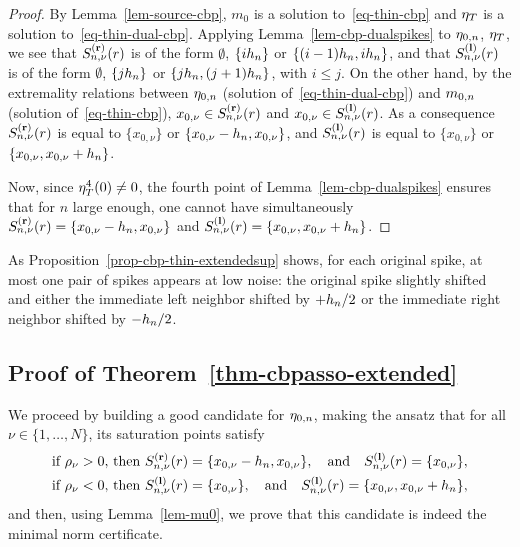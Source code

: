 \begin{proof}
By Lemma~\ref{lem-source-cbp}, $m_0$ is a solution to~\eqref{eq-thin-cbp} and $\eta_T$ is a solution to~\eqref{eq-thin-dual-cbp}. 
Applying Lemma~\ref{lem-cbp-dualspikes} to $\eta_{0,n}$, $\eta_T$, we see that $S_{n,\nu}^{\mathbf{(r)}}(r)$ is of the form $\emptyset$, $\{i{h_n}\}$ or $\{(i-1){h_n},i{h_n}\}$, and that $S_{n,\nu}^{\mathbf{(l)}}(r)$ is of the form $\emptyset$, $\{j{h_n}\}$ or $\{j{h_n},(j+1){h_n}\}$, with $i\leq j$.
On the other hand, by the extremality relations between $\eta_{0,n}$ (solution of~\eqref{eq-thin-dual-cbp}) and $m_{0,n}$ (solution of~\eqref{eq-thin-cbp}), $x_{0,\nu}\in S_{n,\nu}^{\mathbf{(r)}}(r)$ and $x_{0,\nu}\in S_{n,\nu}^{\mathbf{(l)}}(r)$. As a consequence $S_{n,\nu}^{\mathbf{(r)}}(r)$ is equal to $\{x_{0,\nu}\}$ or $\{x_{0,\nu}-{h_n},x_{0,\nu}\}$, and $S_{n,\nu}^{\mathbf{(l)}}(r)$ is  equal to $\{x_{0,\nu}\}$ or $\{x_{0,\nu},x_{0,\nu}+{h_n}\}$.

Now, since $\eta_T^{4}(0)\neq 0$, the fourth point of Lemma~\ref{lem-cbp-dualspikes} ensures that for $n$ large enough, one cannot have simultaneously $S_{n,\nu}^{\mathbf{(r)}}(r)=\{x_{0,\nu}-{h_n},x_{0,\nu}\}$ and $S_{n,\nu}^{\mathbf{(l)}}(r)=\{x_{0,\nu},x_{0,\nu}+{h_n}\}$.
\end{proof}

\begin{rem}
  As Proposition~\ref{prop-cbp-thin-extendedsup} shows, for each original spike, at most one pair of spikes appears at low noise: the original spike slightly shifted and either the immediate left neighbor shifted by $+{h_n}/2$ or the immediate right neighbor shifted by $-{h_n}/2$.
\end{rem}


\subsection{Proof of Theorem~\ref{thm-cbpasso-extended}}
\label{thm-cbpasso-extended-proof}

  We proceed by building a good candidate for $\eta_{0,n}$, making the ansatz that for all $\nu\in\{1,\ldots,N\}$, its saturation points satisfy
\begin{align}
  \mbox{if } \rho_\nu>0,& \mbox{ then }S_{n,\nu}^{\mathbf{(r)}}(r) = \{x_{0,\nu}-{h_n},x_{0,\nu}\}, \quad \text{and} \quad S_{n,\nu}^{\mathbf{(l)}}(r)=\{x_{0,\nu}\}, \\
  \mbox{if } \rho_\nu<0,& \mbox{ then }S_{n,\nu}^{\mathbf{(l)}}(r) = \{x_{0,\nu}\}, \quad \text{and} \quad S_{n,\nu}^{\mathbf{(l)}}(r)=\{x_{0,\nu},x_{0,\nu}+{h_n}\},
\end{align}
 and then, using Lemma~\ref{lem-mu0}, we prove that this candidate is indeed the minimal norm certificate.
 
